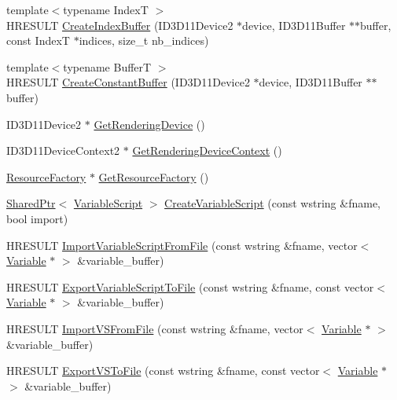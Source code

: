 \begin{DoxyCompactItemize}
\item 
{\footnotesize template$<$typename IndexT $>$ }\\H\+R\+E\+S\+U\+LT \hyperlink{namespacemage_a5a60c12d0fd0ca0e852cf3b0156c9513}{Create\+Index\+Buffer} (I\+D3\+D11\+Device2 $\ast$device, I\+D3\+D11\+Buffer $\ast$$\ast$buffer, const IndexT $\ast$indices, size\+\_\+t nb\+\_\+indices)
\item 
{\footnotesize template$<$typename BufferT $>$ }\\H\+R\+E\+S\+U\+LT \hyperlink{namespacemage_ac008dfd1f142382a04c5e3fd3a3e062e}{Create\+Constant\+Buffer} (I\+D3\+D11\+Device2 $\ast$device, I\+D3\+D11\+Buffer $\ast$$\ast$buffer)
\item 
I\+D3\+D11\+Device2 $\ast$ \hyperlink{namespacemage_a30c7feb10b2be75bbce6d9c3739899c6}{Get\+Rendering\+Device} ()
\item 
I\+D3\+D11\+Device\+Context2 $\ast$ \hyperlink{namespacemage_a55d3eaa7476e19ec8969e27d69249d95}{Get\+Rendering\+Device\+Context} ()
\item 
\hyperlink{classmage_1_1_resource_factory}{Resource\+Factory} $\ast$ \hyperlink{namespacemage_a36a7338e52586e714ef646dea200a115}{Get\+Resource\+Factory} ()
\item 
\hyperlink{namespacemage_a1e01ae66713838a7a67d30e44c67703e}{Shared\+Ptr}$<$ \hyperlink{classmage_1_1_variable_script}{Variable\+Script} $>$ \hyperlink{namespacemage_a4ee2d46e5220246892bb34b7d1e97fbe}{Create\+Variable\+Script} (const wstring \&fname, bool import)
\item 
H\+R\+E\+S\+U\+LT \hyperlink{namespacemage_a6515a0a04b54bd9544eefe5a23ab8c43}{Import\+Variable\+Script\+From\+File} (const wstring \&fname, vector$<$ \hyperlink{structmage_1_1_variable}{Variable} $\ast$ $>$ \&variable\+\_\+buffer)
\item 
H\+R\+E\+S\+U\+LT \hyperlink{namespacemage_a6bbe2c1ce9b49dea0c61ce4eafea6a3d}{Export\+Variable\+Script\+To\+File} (const wstring \&fname, const vector$<$ \hyperlink{structmage_1_1_variable}{Variable} $\ast$ $>$ \&variable\+\_\+buffer)
\item 
H\+R\+E\+S\+U\+LT \hyperlink{namespacemage_ab13ac77392ebda63780e73f720237906}{Import\+V\+S\+From\+File} (const wstring \&fname, vector$<$ \hyperlink{structmage_1_1_variable}{Variable} $\ast$ $>$ \&variable\+\_\+buffer)
\item 
H\+R\+E\+S\+U\+LT \hyperlink{namespacemage_af5780face7eadab7a08f015e3516e137}{Export\+V\+S\+To\+File} (const wstring \&fname, const vector$<$ \hyperlink{structmage_1_1_variable}{Variable} $\ast$ $>$ \&variable\+\_\+buffer)

\end{DoxyCompactItemize}
